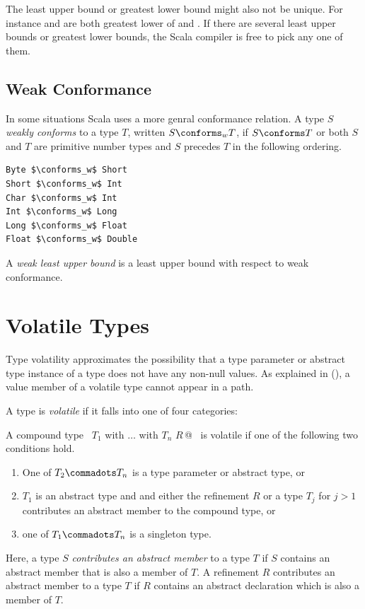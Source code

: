 The least upper bound or greatest lower bound might also not be
unique. For instance  and  are both
greatest lower of  and . If there are several
least upper bounds or greatest lower bounds, the Scala compiler is
free to pick any one of them.

\subsection{Weak Conformance}\label{sec:weakconformance}

In some situations Scala uses a more genral conformance relation. A 
type $S$ {\em weakly conforms} 
to a type $T$, written $S \conforms_w
T$, if $S \conforms T$ or both $S$ and $T$ are primitive number types
and $S$ precedes $T$ in the following ordering.
\begin{lstlisting}
Byte $\conforms_w$ Short 
Short $\conforms_w$ Int
Char $\conforms_w$ Int
Int $\conforms_w$ Long
Long $\conforms_w$ Float
Float $\conforms_w$ Double
\end{lstlisting}

A {\em weak least upper bound} is a least upper bound with respect to
weak conformance.

\section{Volatile Types}
\label{sec:volatile-types}

Type volatility approximates the possibility that a type parameter or abstract type instance
of a type does not have any non-null values.  As explained in
(), a value member of a volatile type cannot appear in
a path.
  
A type is {\em volatile} if it falls into one of four categories:

A compound type ~\lstinline@$T_1$ with $\ldots$ with $T_n$ {$R\,$}@~
is volatile if one of the following two conditions hold.
\begin{enumerate}
\item One of $T_2 \commadots T_n$ is a type parameter or abstract type, or
\item $T_1$ is an abstract type and and either the refinement $R$ 
  or a type $T_j$ for $j > 1$ contributes an abstract member
  to the compound type, or
\item one of $T_1 \commadots T_n$ is a singleton type.
\end{enumerate}
Here, a type $S$ {\em contributes an abstract member} to a type $T$ if
$S$ contains an abstract member that is also a member of $T$.
A refinement $R$ contributes an abstract member to a type $T$ if $R$
contains an abstract declaration which is also a member of $T$.

